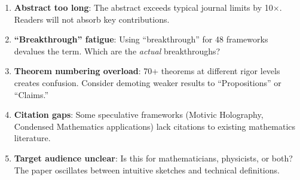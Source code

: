 \documentclass[12pt,a4paper]{article}
\begin{document}
\begin{tcolorbox}[colback=red!5!white, colframe=red!75!black, title=\textbf{RED TEAM Round 3: Presentation Issues}]

\begin{enumerate}[label=\textbf{R3.\arabic*.}]
    \item \textbf{Abstract too long}: The abstract exceeds typical journal limits by 10$\times$. Readers will not absorb key contributions.
    
    \item \textbf{``Breakthrough'' fatigue}: Using ``breakthrough'' for 48 frameworks devalues the term. Which are the \emph{actual} breakthroughs?
    
    \item \textbf{Theorem numbering overload}: 70+ theorems at different rigor levels creates confusion. Consider demoting weaker results to ``Propositions'' or ``Claims.''
    
    \item \textbf{Citation gaps}: Some speculative frameworks (Motivic Holography, Condensed Mathematics applications) lack citations to existing mathematics literature.
    
    \item \textbf{Target audience unclear}: Is this for mathematicians, physicists, or both? The paper oscillates between intuitive sketches and technical definitions.
\end{enumerate}

\end{tcolorbox}
\end{document}
